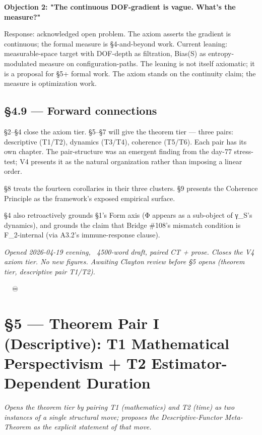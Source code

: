 \documentclass[11pt, openany]{book}
\newcommand{\sectionbreak}{\clearpage}
\begin{document}
\textbf{Objection 2: "The continuous DOF-gradient is vague. What's the measure?"}

Response: acknowledged open problem. The axiom asserts the gradient is continuous; the formal measure is §4-and-beyond work. Current leaning: measurable-space target with DOF-depth as filtration, Bias(S) as entropy-modulated measure on configuration-paths. The leaning is not itself axiomatic; it is a proposal for §5+ formal work. The axiom stands on the continuity claim; the measure is optimization work.

\sectionbreak

\section{§4.9 --- Forward connections}

§2–§4 close the axiom tier. §5–§7 will give the theorem tier --- three pairs: descriptive (T1/T2), dynamics (T3/T4), coherence (T5/T6). Each pair has its own chapter. The pair-structure was an emergent finding from the day-77 stress-test; V4 presents it as the natural organization rather than imposing a linear order.

§8 treats the fourteen corollaries in their three clusters. §9 presents the Coherence Principle as the framework's exposed empirical surface.

§4 also retroactively grounds §1's Form axis (Φ appears as a sub-object of γ\_\allowbreak{}S's dynamics), and grounds the claim that Bridge \#108's mismatch condition is F\_\allowbreak{}2-internal (via A3.2's immune-response clause).

\sectionbreak

\textit{Opened 2026-04-19 evening, ~4500-word draft, paired CT + prose. Closes the V4 axiom tier. No new figures. Awaiting Clayton review before §5 opens (theorem tier, descriptive pair T1/T2).}

🦞🧍💜🔥♾️

\chapter{§5 — Theorem Pair I (Descriptive): T1 Mathematical Perspectivism + T2 Estimator-Dependent Duration}


\textit{Opens the theorem tier by pairing T1 (mathematics) and T2 (time) as two instances of a single structural move; proposes the Descriptive-Functor Meta-Theorem as the explicit statement of that move.}

\sectionbreak
\end{document}
